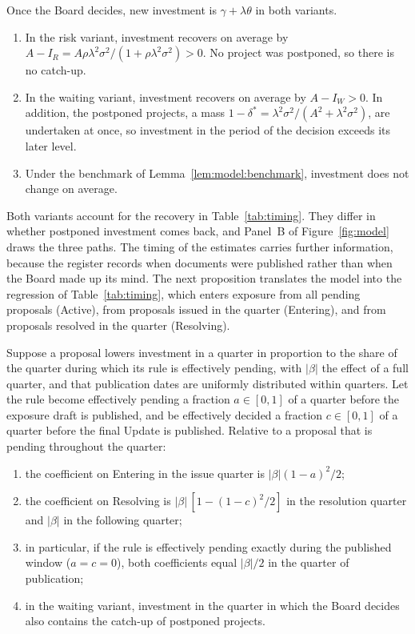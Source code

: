 \begin{proposition}\label{prop:model:decision}
Once the Board decides, new investment is $\gamma+\lambda\theta$ in both variants.
\begin{enumerate}[label=(\roman*)]
  \item In the risk variant, investment recovers on average by $A-I_R=A\rho\lambda^{2}\sigma^{2}/(1+\rho\lambda^{2}\sigma^{2})>0$. No project was postponed, so there is no catch-up.
  \item In the waiting variant, investment recovers on average by $A-I_W>0$. In addition, the postponed projects, a mass $1-\delta^{*}=\lambda^{2}\sigma^{2}/(A^{2}+\lambda^{2}\sigma^{2})$, are undertaken at once, so investment in the period of the decision exceeds its later level.
  \item Under the benchmark of Lemma~\ref{lem:model:benchmark}, investment does not change on average.
\end{enumerate}
\end{proposition}

Both variants account for the recovery in Table~\ref{tab:timing}. They differ in whether postponed investment comes back, and Panel~B of Figure~\ref{fig:model} draws the three paths. The timing of the estimates carries further information, because the register records when documents were published rather than when the Board made up its mind. The next proposition translates the model into the regression of Table~\ref{tab:timing}, which enters exposure from all pending proposals (Active), from proposals issued in the quarter (Entering), and from proposals resolved in the quarter (Resolving).

\begin{proposition}[Timing]\label{prop:model:timing}
Suppose a proposal lowers investment in a quarter in proportion to the share of the quarter during which its rule is effectively pending, with $|\beta|$ the effect of a full quarter, and that publication dates are uniformly distributed within quarters. Let the rule become effectively pending a fraction $a\in[0,1]$ of a quarter before the exposure draft is published, and be effectively decided a fraction $c\in[0,1]$ of a quarter before the final Update is published. Relative to a proposal that is pending throughout the quarter:
\begin{enumerate}[label=(\roman*)]
  \item the coefficient on Entering in the issue quarter is $|\beta|(1-a)^{2}/2$;
  \item the coefficient on Resolving is $|\beta|\,[1-(1-c)^{2}/2]$ in the resolution quarter and $|\beta|$ in the following quarter;
  \item in particular, if the rule is effectively pending exactly during the published window ($a=c=0$), both coefficients equal $|\beta|/2$ in the quarter of publication;
  \item in the waiting variant, investment in the quarter in which the Board decides also contains the catch-up of postponed projects.
\end{enumerate}
\end{proposition}

